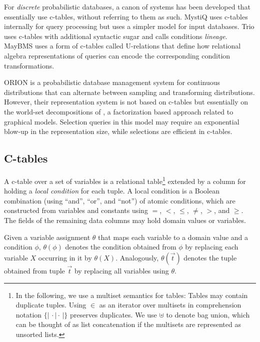 For {\em discrete} probabilistic  databases, a canon of systems has been developed that essentially use c-tables, without referring to them as such. MystiQ  \cite{dalvi07efficient}  uses  c-tables internally  for  query processing  but  uses  a  simpler  model for  input  databases.   Trio \cite{WidomTrio2008}  uses  c-tables with  additional  syntactic sugar  and calls conditions {\em lineage}\/.  MayBMS \cite{AJKO2008}  uses a  form of  c-tables called  U-relations that define how relational algebra representations of queries can encode the corresponding condition transformations.

ORION \cite{ORION} is a probabilistic database management system for
continuous distributions that can alternate between sampling
and transforming distributions. However, their representation
system is not based on c-tables but essentially on the
world-set decompositions of \cite{AKO07WSD}, a factorization
based approach related to graphical models.
Selection queries in this model may require an exponential blow-up in the
representation size, while selections are efficient in c-tables.


\def\bagopen{\{\!|\,}
\def\bagclose{\,|\!\}}


\subsection{C-tables}
A c-table  over
a set  of variables is  a relational table\footnote{
In the following, we use a multiset semantics for tables: Tables may
contain duplicate tuples. Using $\in$ as an iterator over multisets in
comprehension notation $\bagopen \cdot \mid \cdot \bagclose$ preserves
duplicates. We use $\uplus$ to denote bag union, which can be thought of
as list concatenation if the multisets are represented as unsorted lists.
}
extended by a  column for holding a \textit{local  condition} for each
tuple.   A local condition  is a  Boolean combination  (using ``and'',
``or'', and ``not'') of  atomic conditions, which are constructed from
variables  and constants  using  $=$, $<$,  $\leq$,  $\neq$, $>$,  and
$\geq$.   The fields  of the  remaining data  columns may  hold domain
values or variables.

Given  a variable  assignment $\theta$  that maps  each variable  to a
domain  value  and  a  condition $\phi$,  $\theta(\phi)$  denotes  the
condition  obtained  from  $\phi$   by  replacing  each  variable  $X$
occurring  in  it   by  $\theta(X)$.   Analogously,  $\theta(\vec{t})$
denotes  the tuple  obtained  from tuple  $\vec{t}$  by replacing  all
variables using $\theta$.

